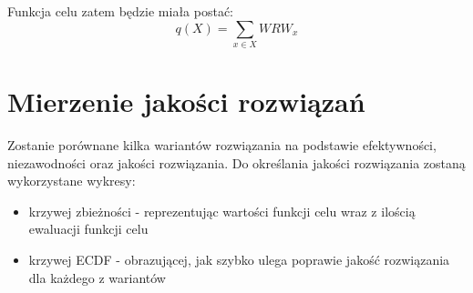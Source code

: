 \documentclass[titlepage]{article}
\begin{document}
            \noindent Funkcja celu zatem będzie miała postać:
            \[
                q(X) = \sum_{x \in X} WRW_{x}
            \]

    \section{
        Mierzenie jakości rozwiązań
    }
        Zostanie porównane kilka wariantów rozwiązania na podstawie efektywności, niezawodności oraz jakości rozwiązania. 
        Do określania jakości rozwiązania zostaną wykorzystane wykresy:
        \begin{itemize}
            \item krzywej zbieżności - reprezentując wartości funkcji celu wraz z ilością ewaluacji funkcji celu
            \item krzywej ECDF - obrazującej, jak szybko ulega poprawie jakość rozwiązania dla każdego z wariantów
        \end{itemize}
\end{document}
